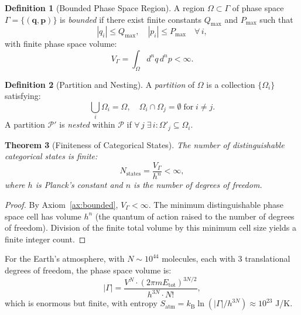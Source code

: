 \documentclass[twocolumn,10pt]{article}
\newtheorem{theorem}{Theorem}[section]
\theoremstyle{definition}
\newtheorem{definition}[theorem]{Definition}
\newcommand{\kB}{k_{\mathrm{B}}}
\begin{document}
\begin{definition}[Bounded Phase Space Region]\label{def:bounded}
A region $\Omega \subset \Gamma$ of phase space $\Gamma = \{(\mathbf{q}, \mathbf{p})\}$ is \emph{bounded} if there exist finite constants $Q_{\max}$ and $P_{\max}$ such that
\begin{equation}\label{eq:bounded}
    |q_i| \leq Q_{\max}, \quad |p_i| \leq P_{\max} \quad \forall\, i,
\end{equation}
with finite phase space volume:
\begin{equation}\label{eq:finite_volume}
    V_\Gamma = \int_\Omega d^nq\, d^np < \infty.
\end{equation}
\end{definition}

\begin{definition}[Partition and Nesting]
A \emph{partition} of $\Omega$ is a collection $\{\Omega_i\}$ satisfying:
\begin{equation}
    \bigcup_i \Omega_i = \Omega, \quad \Omega_i \cap \Omega_j = \emptyset \;\text{for}\; i \neq j.
\end{equation}
A partition $\mathcal{P}'$ is \emph{nested} within $\mathcal{P}$ if $\forall\, j\; \exists\, i: \Omega'_j \subseteq \Omega_i$.
\end{definition}

\begin{theorem}[Finiteness of Categorical States]\label{thm:finite_states}
The number of distinguishable categorical states is finite:
\begin{equation}\label{eq:finite_states}
    N_{\mathrm{states}} = \frac{V_\Gamma}{h^n} < \infty,
\end{equation}
where $h$ is Planck's constant and $n$ is the number of degrees of freedom.
\end{theorem}

\begin{proof}
By Axiom~\ref{ax:bounded}, $V_\Gamma < \infty$. The minimum distinguishable phase space cell has volume $h^n$ (the quantum of action raised to the number of degrees of freedom). Division of the finite total volume by this minimum cell size yields a finite integer count.
\end{proof}

For the Earth's atmosphere, with $N \sim 10^{44}$ molecules, each with 3 translational degrees of freedom, the phase space volume is:
\begin{equation}
    |\Gamma| = \frac{V^N \cdot (2\pi m E_{\mathrm{tot}})^{3N/2}}{h^{3N} \cdot N!},
\end{equation}
which is enormous but finite, with entropy $S_{\mathrm{atm}} = \kB \ln(|\Gamma|/h^{3N}) \approx 10^{23}$ J/K.
\end{document}
